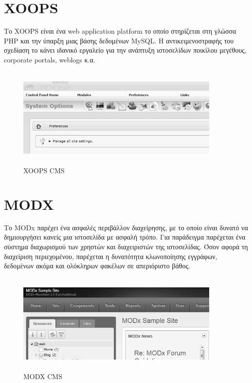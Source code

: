\documentclass[12pt]{report}
\begin{document}
\section{\textlatin{XOOPS}}
Το \textlatin{XOOPS} είναι ένα \textlatin{web application platform} το οποίο στηρίζεται στη γλώσσα \textlatin{PHP} και την ύπαρξη μιας βάσης δεδομένων \textlatin{MySQL}. Η αντικειμενοστραφής του σχεδίαση το κάνει ιδανικό εργαλείο για την ανάπτυξη ιστοσελίδων ποικίλου μεγέθους, \textlatin{corporate portals, weblogs} κ.α.
\begin{figure}[H]
\centering
\includegraphics[width=0.9\textwidth, height=5cm]{xoops-gray}
\caption{\textlatin{XOOPS CMS}}
\label{fig:xoops}
\end{figure}

\section{\textlatin{MODX}}
Το \textlatin{MODx} παρέχει ένα ασφαλές περιβάλλον διαχείρησης, με το οποίο είναι δυνατό να δημιουργήσει κανείς μια ιστοσελίδα με ασφαλή τρόπο. Για παράδειγμα παρέχεται ένα σύστημα διαχωρισμού των χρηστών και διαχειριστών της ιστοσελίδας. Όσον αφορά τη διαχείριση περιεχομένου, παρέχεται η δυνατότητα κλωνοποίησης εγγράφων, δεδομένων ακόμα και ολόκληρων φακέλων σε απεριόριστο βάθος.
\begin{figure}[H]
\centering
\includegraphics[width=0.9\textwidth, height=5cm]{modx-gray}
\caption{\textlatin{MODX CMS}}
\label{fig:modx}
\end{figure}
\end{document}
